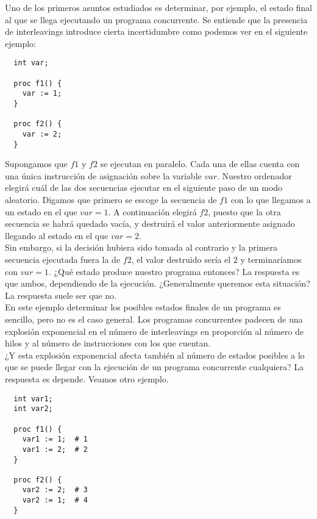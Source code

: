 Uno de los primeros asuntos estudiados es determinar, por ejemplo, el estado final al que se llega ejecutando un programa concurrente. Se entiende que la presencia de interleavings introduce cierta incertidumbre como podemos ver en el siguiente ejemplo:

\begin{lstlisting}
  int var;

  proc f1() {
    var := 1;
  }

  proc f2() {
    var := 2;
  }
\end{lstlisting}

Supongamos que $f1$ y $f2$ se ejecutan en paralelo. Cada una de ellas cuenta con una única instrucción de asignación sobre la variable $var$. Nuestro ordenador elegirá cuál de las dos secuencias ejecutar en el siguiente paso de un modo aleatorio. Digamos que primero se escoge la secuencia de $f1$ con lo que llegamos a un estado en el que $var = 1$. A continuación elegirá $f2$, puesto que la otra secuencia se habrá quedado vacía, y destruirá el valor anteriormente asignado llegando al estado en el que $var = 2$.\\

Sin embargo, si la decisión hubiera sido tomada al contrario y la primera secuencia ejecutada fuera la de $f2$, el valor destruido sería el $2$ y terminaríamos con $var = 1$. ¿Qué estado produce nuestro programa entonces? La respuesta es que ambos, dependiendo de la ejecución. ¿Generalmente queremos esta situación? La respuesta suele ser que no.\\

En este ejemplo determinar los posibles estados finales de un programa es sencillo, pero no es el caso general. Los programas concurrentes padecen de una explosión exponencial en el número de interleavings en proporción al número de hilos y al número de instrucciones con los que cuentan.\\

¿Y esta explosión exponencial afecta también al número de estados posibles a lo que se puede llegar con la ejecución de un programa concurrente cualquiera? La respuesta es depende. Veamos otro ejemplo.

\begin{lstlisting}
  int var1;
  int var2;

  proc f1() {
    var1 := 1;  # 1
    var1 := 2;  # 2
  }

  proc f2() {
    var2 := 2;  # 3
    var2 := 1;  # 4
  }
\end{lstlisting}

